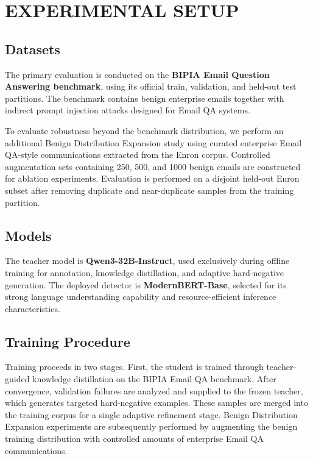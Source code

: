 \documentclass[conference]{IEEEtran}
\begin{document}
\section{EXPERIMENTAL SETUP}

\subsection{Datasets}

The primary evaluation is conducted on the \textbf{BIPIA Email Question Answering benchmark}, using its official train, validation, and held-out test partitions. The benchmark contains benign enterprise emails together with indirect prompt injection attacks designed for Email QA systems.

To evaluate robustness beyond the benchmark distribution, we perform an additional Benign Distribution Expansion study using curated enterprise Email QA-style communications extracted from the Enron corpus. Controlled augmentation sets containing 250, 500, and 1000 benign emails are constructed for ablation experiments. Evaluation is performed on a disjoint held-out Enron subset after removing duplicate and near-duplicate samples from the training partition.

\subsection{Models}

The teacher model is \textbf{Qwen3-32B-Instruct}, used exclusively during offline training for annotation, knowledge distillation, and adaptive hard-negative generation. The deployed detector is \textbf{ModernBERT-Base}, selected for its strong language understanding capability and resource-efficient inference characteristics.

\subsection{Training Procedure}

Training proceeds in two stages. First, the student is trained through teacher-guided knowledge distillation on the BIPIA Email QA benchmark. After convergence, validation failures are analyzed and supplied to the frozen teacher, which generates targeted hard-negative examples. These samples are merged into the training corpus for a single adaptive refinement stage. Benign Distribution Expansion experiments are subsequently performed by augmenting the benign training distribution with controlled amounts of enterprise Email QA communications.
\end{document}
